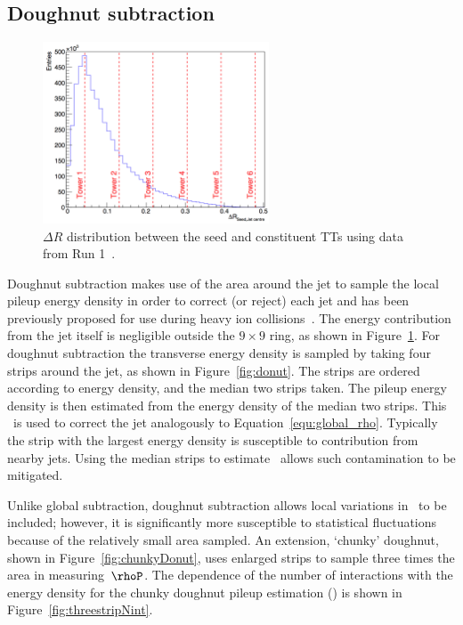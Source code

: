 \subsection{Doughnut subtraction}
\begin{figure}
\centering
    \includegraphics[width=0.6\textwidth]{./Figures/triggerUpgrade/deltaR2}
  \caption{$\Delta R$ distribution between the seed and constituent TTs using data from Run 1~\cite{mark-thesis}.}
  \label{fig:deltaR2}
\end{figure}  


Doughnut subtraction makes use of the area around the jet to sample the local pileup
energy density in order to correct (or reject) each jet and has been previously proposed
for use during heavy ion collisions~\cite{doughnut}. The energy contribution from the jet
itself is negligible outside the $9\times9$ ring, as shown in Figure~\ref{fig:deltaR2}. 
For doughnut subtraction the transverse energy density is sampled by taking four strips around 
the jet, as shown in Figure~\ref{fig:donut}. The strips are ordered according to energy density,
and the median two strips taken. The pileup energy density is then estimated from the 
energy density of the median two strips. This \rhoD~is used to correct the
jet analogously to Equation~\ref{equ:global_rho}. Typically the strip with the largest
energy density is susceptible to contribution from nearby jets. Using the median 
strips to estimate \rhoP~allows such contamination to be mitigated.

Unlike global subtraction, doughnut subtraction allows local variations in \rhoP~to be 
included; however, it is significantly more susceptible to statistical fluctuations because of the 
relatively small area sampled. An extension, `chunky' doughnut, shown in Figure~\ref{fig:chunkyDonut},
uses enlarged strips to sample three times the area in measuring~$\rhoP$. The dependence of the number of interactions
with the energy density for the chunky doughnut pileup estimation (\rhoC) is shown in Figure~\ref{fig:threestripNint}.

